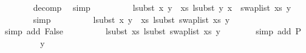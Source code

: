\begin{isabellebody}
\ \ \ \ \ \ \isamarkupfalse%
\ decomp\ \isamarkupfalse%
\ simp\isanewline
\ \ \ \ \isamarkupfalse%
\ \isamarkupfalse%
\ {\isachardoublequoteopen}{\isachardot}{\kern0pt}{\isachardot}{\kern0pt}{\isachardot}{\kern0pt}\ {\isacharequal}{\kern0pt}\ lsubst\ {\isacharparenleft}{\kern0pt}{\isacharparenleft}{\kern0pt}x{\isacharcomma}{\kern0pt}\ y{\isacharprime}{\kern0pt}{\isacharparenright}{\kern0pt}\ {\isacharhash}{\kern0pt}\ xs{\isacharparenright}{\kern0pt}\ {\isacharparenleft}{\kern0pt}lsubst\ {\isacharparenleft}{\kern0pt}{\isacharparenleft}{\kern0pt}y{\isacharprime}{\kern0pt}{\isacharcomma}{\kern0pt}\ x{\isacharparenright}{\kern0pt}\ {\isacharhash}{\kern0pt}\ swap{\isacharunderscore}{\kern0pt}list\ xs{\isacharparenright}{\kern0pt}\ y{\isacharparenright}{\kern0pt}{\isachardoublequoteclose}\isanewline
\ \ \ \ \ \ \isamarkupfalse%
\ simp\isanewline
\ \ \ \ \isamarkupfalse%
\ \isamarkupfalse%
\ {\isachardoublequoteopen}{\isachardot}{\kern0pt}{\isachardot}{\kern0pt}{\isachardot}{\kern0pt}\ {\isacharequal}{\kern0pt}\ lsubst\ {\isacharparenleft}{\kern0pt}{\isacharparenleft}{\kern0pt}x{\isacharcomma}{\kern0pt}\ y{\isacharprime}{\kern0pt}{\isacharparenright}{\kern0pt}\ {\isacharhash}{\kern0pt}\ xs{\isacharparenright}{\kern0pt}\ {\isacharparenleft}{\kern0pt}lsubst\ {\isacharparenleft}{\kern0pt}swap{\isacharunderscore}{\kern0pt}list\ xs{\isacharparenright}{\kern0pt}\ y{\isacharparenright}{\kern0pt}{\isachardoublequoteclose}\isanewline
\ \ \ \ \ \ \isamarkupfalse%
\ {\isacharparenleft}{\kern0pt}simp\ add{\isacharcolon}{\kern0pt}\ False{\isacharparenright}{\kern0pt}\isanewline
\ \ \ \ \isamarkupfalse%
\ \isamarkupfalse%
\ {\isachardoublequoteopen}{\isachardot}{\kern0pt}{\isachardot}{\kern0pt}{\isachardot}{\kern0pt}\ {\isacharequal}{\kern0pt}\ lsubst\ xs\ {\isacharparenleft}{\kern0pt}lsubst\ {\isacharparenleft}{\kern0pt}swap{\isacharunderscore}{\kern0pt}list\ xs{\isacharparenright}{\kern0pt}\ y{\isacharparenright}{\kern0pt}{\isachardoublequoteclose}\isanewline
\ \ \ \ \ \ \isamarkupfalse%
\ {\isacharparenleft}{\kern0pt}simp\ add{\isacharcolon}{\kern0pt}\ P{}{\isacharparenright}{\kern0pt}\isanewline
\ \ \ \ \isamarkupfalse%
\ \isamarkupfalse%
\ {\isachardoublequoteopen}{\isachardot}{\kern0pt}{\isachardot}{\kern0pt}{\isachardot}{\kern0pt}\ {\isacharequal}{\kern0pt}\ y{\isachardoublequoteclose}\isanewline
\ \ \ \ \ \ \isamarkupfalse%

\end{isabellebody}
